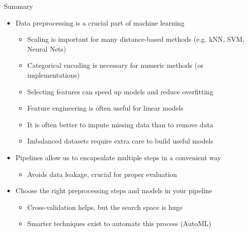 \begin{frame}{Summary}
\begin{itemize}
    \item Data preprocessing is a crucial part of machine learning
    \begin{itemize}
        \item Scaling is important for many distance-based methods (e.g. kNN, SVM, Neural Nets)
        \item Categorical encoding is necessary for numeric methods (or implementations)
        \item Selecting features can speed up models and reduce overfitting
        \item Feature engineering is often useful for linear models
        \item It is often better to impute missing data than to remove data
        \item Imbalanced datasets require extra care to build useful models
    \end{itemize}
    \item Pipelines allow us to encapsulate multiple steps in a convenient way
    \begin{itemize}
        \item Avoids data leakage, crucial for proper evaluation
    \end{itemize}
    \item Choose the right preprocessing steps and models in your pipeline
    \begin{itemize}
        \item Cross-validation helps, but the search space is huge
        \item Smarter techniques exist to automate this process (AutoML)
    \end{itemize}
\end{itemize}
\end{frame}
